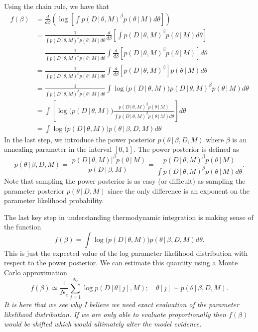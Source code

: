 \documentclass[11pt]{article}
\begin{document}
Using the chain rule, we have that 
\begin{align}
f(\beta) &= \frac{d}{d\beta} \left(\log \left[\int p(D\,|\,\theta,M)^\beta p(\theta\,|\, M) d\theta \right]\right)\\
&=  \frac{1}{\int p(D\,|\,\theta,M)^\beta p(\theta\,|\, M) d\theta } \frac{d}{d\beta}\left[\int p(D\,|\,\theta,M)^\beta p(\theta\,|\, M) d\theta \right]\\
&=  \frac{1}{\int p(D\,|\,\theta,M)^\beta p(\theta\,|\, M) d\theta }\int \frac{d}{d\beta}\left[p(D\,|\,\theta,M)^\beta p(\theta\,|\, M)\right] d\theta \\
&=  \frac{1}{\int p(D\,|\,\theta,M)^\beta p(\theta\,|\, M) d\theta } \int \frac{d}{d\beta}\left[p(D\,|\,\theta,M)^\beta\right] p(\theta\,|\, M) d\theta \\
&=  \frac{1}{\int p(D\,|\,\theta,M)^\beta p(\theta\,|\, M) d\theta } \int \log \Big(p(D\,|\,\theta,M)\Big)p(D\,|\,\theta,M)^\beta p(\theta\,|\, M) d\theta \\
&=  \int \left[\log \Big(p(D\,|\,\theta,M)\Big)
\frac{p(D\,|\,\theta,M)^\beta p(\theta\,|\, M)}{\int p(D\,|\,\theta,M)^\beta p(\theta\,|\, M) d\theta }\right]
 d\theta \\
&=  \int \log \Big(p(D\,|\,\theta,M)\Big)p(\theta\,|\, \beta,D,M)  d\theta 
\end{align}
In the last step, we introduce the  power posterior $p(\theta\,|\, \beta,D,M)$ where $\beta$ is an annealing parameter in the interval $[0,1]$.
The power posterior is defined as
\begin{equation}
p(\theta\,|\, \beta,D,M) = \frac{\big[p(D\,|\, \theta,M)\big]^\beta p(\theta\,|\, M)}{p(D\,|\, \beta,M)} = \frac{p(D\,|\,\theta,M)^\beta p(\theta\,|\, M)}{\int p(D\,|\,\theta,M)^\beta p(\theta\,|\, M) d\theta }.
\end{equation}
Note that sampling the power posterior is as easy (or difficult) as sampling the parameter posterior $p(\theta\,|\,D,M)$ since the only difference is an exponent on the parameter likelihood probability.

The last key step in understanding thermodynamic integration is making sense of the function 
\begin{equation}
f(\beta) =  \int \log \Big(p(D\,|\,\theta,M)\Big)p(\theta\,|\, \beta,D,M)  d\theta .
\end{equation}
This is just the expected value of the log parameter likelihood distribution with respect to the power posterior.
We can estimate this quantity using a Monte Carlo approximation
\begin{equation}
f(\beta)\simeq \frac{1}{N_e}\sum_{j=1}^{N_e} \log p(D\,|\,\theta[j],M);\quad \theta[j]\sim p(\theta\,|\, \beta,D,M). 
\end{equation}
\textit{It is here that we see why I believe we need exact evaluation of the parameter likelihood distribution. 
If we are only able to evaluate proportionally then $f(\beta)$ would be shifted which would ultimately alter the model evidence.}
\end{document}
